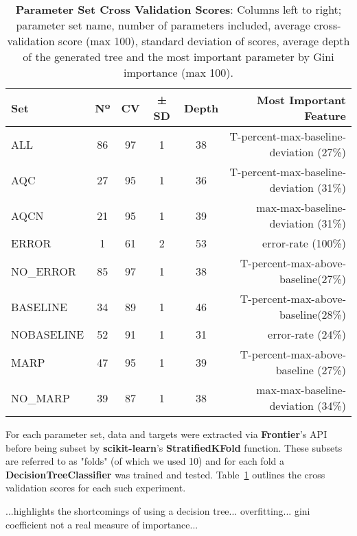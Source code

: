 \begin{table}
    \centering
    \begin{tabular}{l | c  c  c  c  r}
        Set           & Nº & CV  & ± SD & Depth & Most Important Feature\\
        \hline
        ALL           & 86 & 97 & 1 & 38 & T-percent-max-baseline-deviation (27\%)\\
        AQC           & 27 & 95 & 1 & 36 & T-percent-max-baseline-deviation (31\%)\\
        AQCN          & 21 & 95 & 1 & 39 & max-max-baseline-deviation (31\%)\\
        ERROR         & 1  & 61 & 2 & 53 & error-rate (100\%)\\
        NO\_ERROR     & 85 & 97 & 1 & 38 & T-percent-max-above-baseline(27\%)\\
        BASELINE      & 34 & 89 & 1 & 46 & T-percent-max-above-baseline(28\%)\\
        NOBASELINE    & 52 & 91 & 1 & 31 & error-rate (24\%)\\
        MARP          & 47 & 95 & 1 & 39 & T-percent-max-above-baseline (27\%)\\
        NO\_MARP      & 39 & 87 & 1 & 38 & max-max-baseline-deviation (34\%)\\
    \end{tabular}

    \caption[pset-cv]{\textbf{Parameter Set Cross Validation Scores}: Columns
        left to right; parameter set name, number of parameters included,
        average cross-validation score (max 100), standard deviation of scores,
        average depth of the generated tree and the most important parameter by
    Gini importance (max 100).}

    \label{tab:pset-cv}
\end{table}

For each parameter set, data and targets were extracted via \textbf{Frontier}'s
API before being subset by \textbf{scikit-learn}'s \textbf{StratifiedKFold}
function. These subsets are referred to as "folds" (of which we used 10) and for
each fold a \textbf{DecisionTreeClassifier} was trained and tested.
Table~\ref{tab:pset-cv} outlines the cross validation scores for each such
experiment.

...highlights the shortcomings of using a decision tree...
overfitting... gini coefficient not a real measure of importance...

